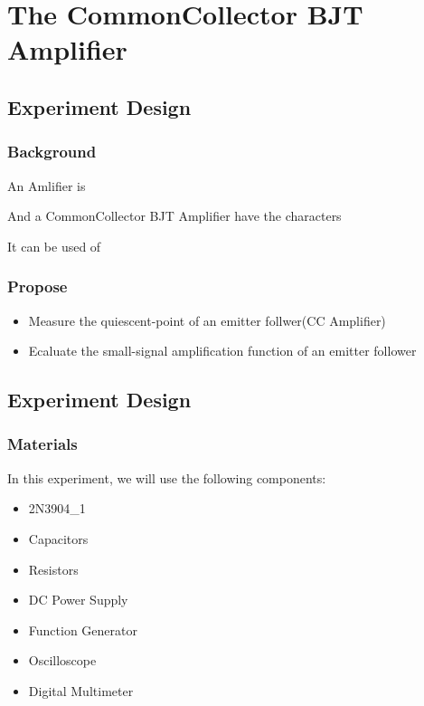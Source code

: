 \section{The Common\-Collector BJT Amplifier}

\subsection{Experiment Design}
    \subsubsection{Background}
    An Amlifier is

    And a Common\-Collector BJT Amplifier have the characters

    It can be used of

    \subsubsection{Propose}
    \begin{itemize}
        \item Measure the quiescent-point of an emitter follwer(CC Amplifier)
        \item Ecaluate the small-signal amplification function of an emitter follower
    \end{itemize}

\subsection{Experiment Design}
    \subsubsection{Materials}
        In this experiment, we will use the following components:
        \begin{itemize}
            \item 2N3904\_1
            \item Capacitors
            \item Resistors
            \item DC Power Supply
            \item Function Generator
            \item Oscilloscope
            \item Digital Multimeter
        \end{itemize}
